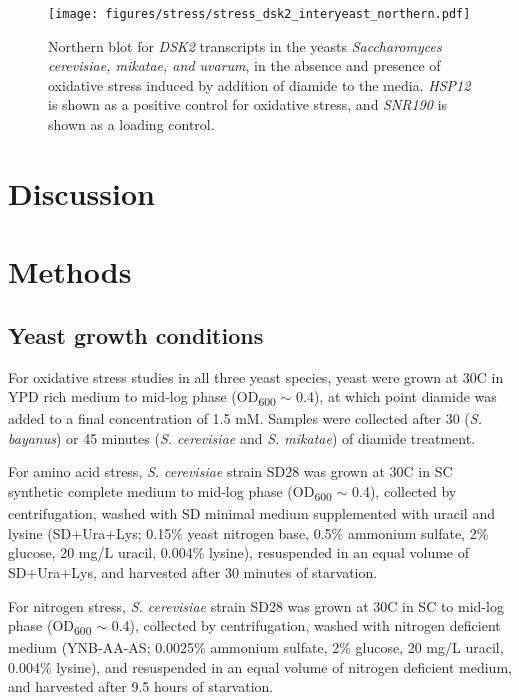 \begin{figure}
    \centering
    \texttt{[image: figures/stress/stress\_dsk2\_interyeast\_northern.pdf]}
    \caption[Northern blot for \textit{DSK2} transcripts in the yeasts \textit{Saccharomyces cerevisiae, mikatae, and uvarum}, in the absence and presence of oxidative stress.]{Northern blot for \textit{DSK2} transcripts in the yeasts \textit{Saccharomyces cerevisiae, mikatae, and uvarum}, in the absence and presence of oxidative stress induced by addition of diamide to the media. \textit{HSP12} is shown as a positive control for oxidative stress, and \textit{SNR190} is shown as a loading control.}
    \label{fig:stress_dsk2_interyeast_northern}
\end{figure}

\section{Discussion}

\lipsum[1]

\section{Methods}

\subsection{Yeast growth conditions}
\label{subsec:stress_growth_conditions}

For oxidative stress studies in all three yeast species, yeast were grown at 30\textdegree C in YPD rich medium to mid-log phase (OD\textsubscript{600} $\sim$ 0.4), at which point diamide was added to a final concentration of 1.5 mM.
Samples were collected after 30 (\textit{S. bayanus}) or 45 minutes (\textit{S. cerevisiae} and \textit{S. mikatae}) of diamide treatment.

For amino acid stress, \textit{S. cerevisiae} strain SD28 was grown at 30\textdegree C in SC synthetic complete medium to mid-log phase (OD\textsubscript{600} $\sim$ 0.4), collected by centrifugation, washed with SD minimal medium supplemented with uracil and lysine (SD+Ura+Lys; 0.15\% yeast nitrogen base, 0.5\% ammonium sulfate, 2\% glucose, 20 mg/L uracil, 0.004\% lysine), resuspended in an equal volume of SD+Ura+Lys, and harvested after 30 minutes of starvation.

For nitrogen stress, \textit{S. cerevisiae} strain SD28 was grown at 30\textdegree C in SC to mid-log phase (OD\textsubscript{600} $\sim$ 0.4), collected by centrifugation, washed with nitrogen deficient medium (YNB-AA-AS; 0.0025\% ammonium sulfate, 2\% glucose, 20 mg/L uracil, 0.004\% lysine), and resuspended in an equal volume of nitrogen deficient medium, and harvested after 9.5 hours of starvation.

